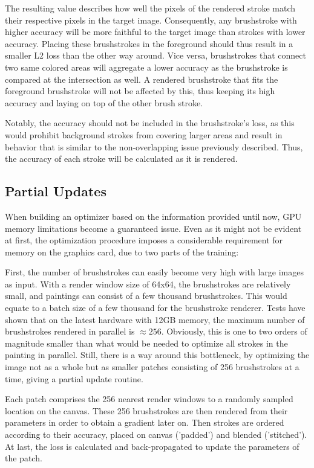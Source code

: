 The resulting value describes how well the pixels of the rendered stroke match their respective pixels in the target image.
Consequently, any brushstroke with higher accuracy will be more faithful to the target image than strokes with lower accuracy.
Placing these brushstrokes in the foreground should thus result in a smaller L2 loss than the other way around.
Vice versa, brushstrokes that connect two same colored areas will aggregate a lower accuracy as the brushstroke is compared at the intersection as well.
A rendered brushstroke that fits the foreground brushstroke will not be affected by this, thus keeping its high accuracy and laying on top of the other brush stroke.

Notably, the accuracy should not be included in the brushstroke's loss, as this would prohibit background strokes from covering larger areas and result in behavior that is similar to the non-overlapping issue previously described.
Thus, the accuracy of each stroke will be calculated as it is rendered.



\subsection{Partial Updates}
When building an optimizer based on the information provided until now, GPU memory limitations become a guaranteed issue.
Even as it might not be evident at first, the optimization procedure imposes a considerable requirement for memory on the graphics card, due to two parts of the training:

First, the number of brushstrokes can easily become very high with large images as input.
With a render window size of 64x64, the brushstrokes are relatively small, and paintings can consist of a few thousand brushstrokes.
This would equate to a batch size of a few thousand for the brushstroke renderer.
Tests have shown that on the latest hardware with 12GB memory, the maximum number of brushstrokes rendered in parallel is $\approx 256$.
Obviously, this is one to two orders of magnitude smaller than what would be needed to optimize all strokes in the painting in parallel.
Still, there is a way around this bottleneck, by optimizing the image not as a whole but as smaller patches consisting of 256 brushstrokes at a time, giving a partial update routine.

Each patch comprises the 256 nearest render windows to a randomly sampled location on the canvas.
These 256 brushstrokes are then rendered from their parameters in order to obtain a gradient later on.
Then strokes are ordered according to their accuracy, placed on canvas ('padded') and blended ('stitched').
At last, the loss is calculated and back-propagated to update the parameters of the patch.

